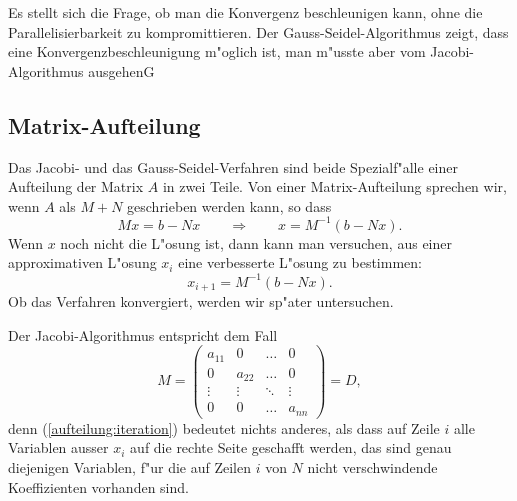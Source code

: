Es stellt sich die Frage, ob man die Konvergenz beschleunigen kann,
ohne die Parallelisierbarkeit zu kompromittieren.
Der Gauss-Seidel-Algorithmus zeigt, dass eine Konvergenzbeschleunigung
m"oglich ist, man m"usste aber vom Jacobi-Algorithmus ausgehenG


\subsection{Matrix-Aufteilung}
Das Jacobi- und das Gauss-Seidel-Verfahren sind beide Spezialf"alle
einer Aufteilung der Matrix $A$ in zwei Teile. 
Von einer Matrix-Aufteilung sprechen wir, wenn $A$ als $M+N$ geschrieben
werden kann, so dass
\begin{equation}
Mx=b-Nx
\qquad
\Rightarrow
\qquad
x=M^{-1}(b-Nx).
\label{aufteilung:iteration}
\end{equation}
Wenn $x$ noch nicht die L"osung ist, dann kann man versuchen, aus einer
approximativen L"osung $x_i$ eine verbesserte L"osung zu bestimmen:
\[
x_{i+1}=M^{-1}(b - Nx).
\]
Ob das Verfahren konvergiert, werden wir sp"ater untersuchen.

Der Jacobi-Algorithmus entspricht dem Fall 
\begin{equation}
M=\begin{pmatrix}
a_{11}&     0&\dots &0\\
     0&a_{22}&\dots &0\\
\vdots&\vdots&\ddots&\vdots\\
     0&     0&\dots &a_{nn}
\end{pmatrix}=D,
\label{jacobi-aufteilung}
\end{equation}
denn (\ref{aufteilung:iteration}) bedeutet nichts anderes,
als dass auf Zeile $i$ alle Variablen ausser $x_i$ auf die rechte
Seite geschafft werden, das sind genau diejenigen Variablen, f"ur die
auf Zeilen $i$ von $N$ nicht verschwindende Koeffizienten vorhanden sind.

